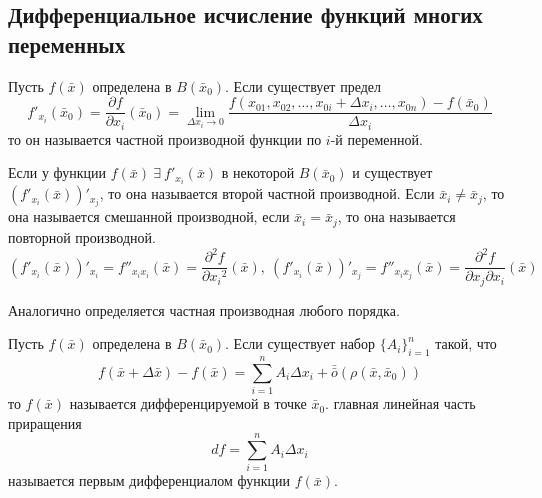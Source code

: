 \subsection{Дифференциальное исчисление функций многих переменных}
\begin{definition}
    Пусть $f(\bar{x})$ определена в $B(\bar{x}_0)$. Если существует предел
    \[f'_{x_i}(\bar{x}_0)=\frac{\partial {f}}{\partial {x_i}}(\bar{x}_0)=\lim\limits_{\Delta x_i\to 0}\frac{f(x_{01}, x_{02}, \dots, x_{0i}+\Delta x_i, \dots, x_{0n})-f(\bar{x}_0)}{\Delta x_i}\]
    то он называется частной производной функции по $i$-й переменной.
\end{definition} 
\begin{definition}
    Если у функции $f(\bar{x})\ \exists\ f'_{x_i}(\bar{x})$ в некоторой $B(\bar{x}_0)$ и существует $(f'_{x_i}(\bar{x}))'_{x_j}$, то она называется второй частной производной. Если $\bar{x}_i\ne \bar{x}_j$, то она называется смешанной производной, если $\bar{x}_i=\bar{x}_j$, то она называется повторной производной.
    \[(f'_{x_i}(\bar{x}))'_{x_i}=f''_{x_i x_i}(\bar{x})=\frac{\partial^2 {f}}{\partial {x_i}^2}(\bar{x}),\ (f'_{x_i}(\bar{x}))'_{x_j}=f''_{x_i x_j}(\bar{x})=\frac{\partial^2 {f}}{\partial {x_j}\partial {x_i}}(\bar{x})\]
\end{definition} 
\begin{comm}
    Аналогично определяется частная производная любого порядка.
\end{comm}
\begin{definition}
    Пусть $f(\bar{x})$ определена в $B(\bar{x}_0)$. Если существует набор $\{A_i\}_{i=1}^n$ такой, что
    \[f(\bar{x}+\Delta \bar{x})-f(\bar{x})=\sum\limits_{i=1}^{n}A_i \Delta x_i +\bar{\bar{o}}{(\rho(\bar{x}, \bar{x}_0))}\]
    то $f(\bar{x})$ называется дифференцируемой в точке $\bar{x}_0$. главная линейная часть приращения 
    \[df=\sum\limits_{i=1}^{n}A_i \Delta x_i\]
    называется первым дифференциалом функции $f(\bar{x})$.
\end{definition} 
